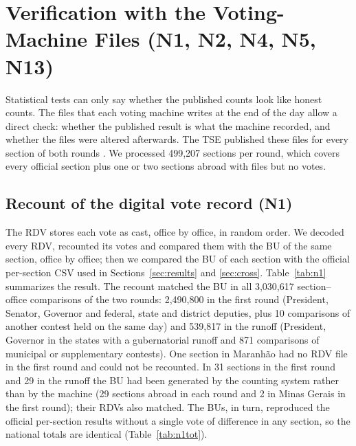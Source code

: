 \section{Verification with the Voting-Machine Files (N1, N2, N4, N5, N13)}
\label{sec:machine}

Statistical tests can only say whether the published counts look like
honest counts. The files that each voting machine writes at the end of the
day allow a direct check: whether the published result is what the machine
recorded, and whether the files were altered afterwards. The TSE published
these files for every section of both rounds \cite{tse2026urna}. We
processed 499,207 sections per round, which covers every official section
plus one or two sections abroad with files but no votes.

\subsection{Recount of the digital vote record (N1)}

The RDV stores each vote as cast, office by office, in random order. We
decoded every RDV, recounted its votes and compared them with the BU of the
same section, office by office; then we compared the BU of each section with
the official per-section CSV used in Sections~\ref{sec:results} and
\ref{sec:cross}. Table~\ref{tab:n1} summarizes the result. The recount
matched the BU in all 3,030,617 section--office comparisons of the two
rounds: 2,490,800 in the first round (President, Senator, Governor and
federal, state and district deputies, plus 10 comparisons of another
contest held on the same day) and 539,817 in the runoff (President,
Governor in the states with a gubernatorial runoff and 871 comparisons of
municipal or supplementary contests). One section in Maranh\~ao had no RDV
file in the first round and could not be recounted. In 31 sections in the
first round and 29 in the runoff the BU had been generated by the counting
system rather than by the machine (29 sections abroad in each round and 2
in Minas Gerais in the first round); their RDVs also matched. The BUs, in
turn, reproduced the official per-section results without a single vote of
difference in any section, so the national totals are identical
(Table~\ref{tab:n1tot}).

